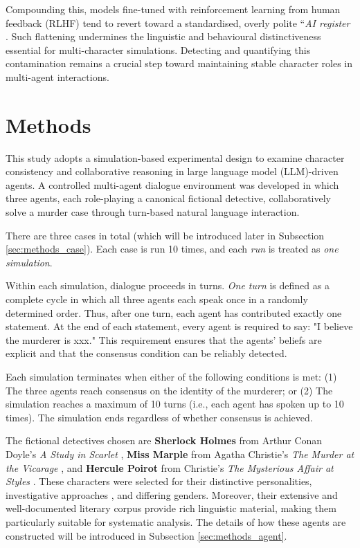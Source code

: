 \documentclass{article}
\begin{document}
Compounding this, models fine-tuned with reinforcement learning from human feedback (RLHF) tend to revert toward a standardised, overly polite “\emph{AI register} \citep{park2023generative, shanahan2023role, moon2024anthology}. Such flattening undermines the linguistic and behavioural distinctiveness essential for multi-character simulations. Detecting and quantifying this contamination remains a crucial step toward maintaining stable character roles in multi-agent interactions.


\section{Methods} \label{sec:methods}

This study adopts a simulation-based experimental design to examine character consistency and collaborative reasoning in large language model (LLM)-driven agents. A controlled multi-agent dialogue environment was developed in which three agents, each role-playing a canonical fictional detective, collaboratively solve a murder case through turn-based natural language interaction.

There are three cases in total (which will be introduced later in Subsection \ref{sec:methods_case}). Each case is run 10 times, and each \emph{run} is treated as \emph{one simulation}. 

Within each simulation, dialogue proceeds in turns. \emph{One turn} is defined as a complete cycle in which all three agents each speak once in a randomly determined order. Thus, after one turn, each agent has contributed exactly one statement. At the end of each statement, every agent is required to say: "I believe the murderer is xxx." This requirement ensures that the agents' beliefs are explicit and that the consensus condition can be reliably detected.

Each simulation terminates when either of the following conditions is met: (1) The three agents reach consensus on the identity of the murderer; or (2) The simulation reaches a maximum of 10 turns (i.e., each agent has spoken up to 10 times). The simulation ends regardless of whether consensus is achieved. 

The fictional detectives chosen are \textbf{Sherlock Holmes} from Arthur Conan Doyle's \textit{A Study in Scarlet} \citep{doyle1887study}, \textbf{Miss Marple} from Agatha Christie's \textit{The Murder at the Vicarage} \citep{christie1930murder}, and \textbf{Hercule Poirot} from Christie's \textit{The Mysterious Affair at Styles} \citep{christie1920mysterious}. These characters were selected for their distinctive personalities, investigative approaches \citep{delima2025detective}, and differing genders. Moreover, their extensive and well-documented literary corpus provide rich linguistic material, making them particularly suitable for systematic analysis. The details of how these agents are constructed will be introduced in Subsection \ref{sec:methods_agent}.
\end{document}
